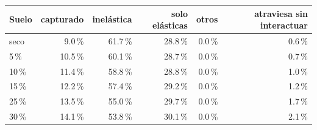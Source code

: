 \begin{tabular}{lrrrrr}
\toprule
Suelo & capturado & inelástica & solo elásticas & otros & atraviesa sin interactuar \\
\midrule
seco & 9.0\,\% & 61.7\,\% & 28.8\,\% & 0.0\,\% & 0.6\,\% \\
5\,\% & 10.5\,\% & 60.1\,\% & 28.7\,\% & 0.0\,\% & 0.7\,\% \\
10\,\% & 11.4\,\% & 58.8\,\% & 28.8\,\% & 0.0\,\% & 1.0\,\% \\
15\,\% & 12.2\,\% & 57.4\,\% & 29.2\,\% & 0.0\,\% & 1.2\,\% \\
25\,\% & 13.5\,\% & 55.0\,\% & 29.7\,\% & 0.0\,\% & 1.7\,\% \\
30\,\% & 14.1\,\% & 53.8\,\% & 30.1\,\% & 0.0\,\% & 2.1\,\% \\
\bottomrule
\end{tabular}

